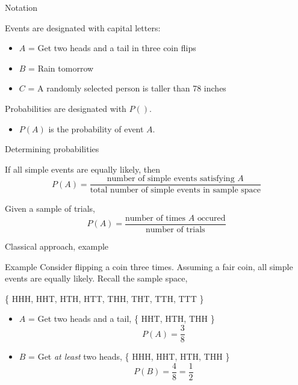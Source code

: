 \documentclass[xcolor=table]{beamer}
\begin{document}
\begin{frame}{Notation}
\begin{block}{}
Events are designated with capital letters:
\pause
\begin{itemize}
\item $A$ = Get two heads and a tail in three coin flips
\item $B$ = Rain tomorrow
\item $C$ = A randomly selected person is taller than 78 inches
\end{itemize}
\end{block}

\pause
\begin{block}{}
Probabilities are designated with $P()$.
\pause
\begin{itemize}
\item $P(A)$ is the probability of event $A$.
\end{itemize}
\end{block}
\end{frame}

\begin{frame}{Determining probabilities}
\begin{block}{}
 If all simple events are equally likely, then
\[P(A) = \frac{\text{number of simple events satisfying } A}{\text{total number of simple events in sample space}}\] 
\end{block}

\pause

\begin{block}{}
 Given a sample of trials,
\[P(A) = \frac{\text{number of times } A \text{ occured}}{\text{number of trials}}\]
\end{block}

\end{frame}

\begin{frame}{Classical approach, example}
\begin{exampleblock}{Example}
Consider flipping a coin three times. Assuming a fair coin, all simple events are equally likely. Recall the sample space,\\
\smallskip
{\centering
\{ HHH, HHT, HTH, HTT, THH, THT, TTH, TTT \} \par
}
\begin{itemize}
\pause
\item $A$ = Get two heads and a tail, \{ HHT, HTH, THH \}
\pause
\[ P(A) = \frac 3 8\]

\pause
\item $B$ = Get \emph{at least} two heads,  \{ HHH,  HHT, HTH, THH \}
\pause
\[ P(B) = \frac 4 8 = \frac 1 2\]
\end{itemize}
\end{exampleblock}
\end{frame}
\end{document}
